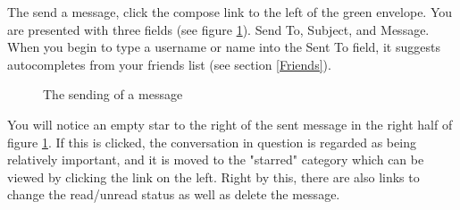 \documentclass[10pt]{article}
\begin{document}
\begin{flushleft}
The send a message, click the compose link to the left of the green envelope.  You are presented with three fields (see figure \ref{sos}).  Send To, Subject, and Message.  When you begin to type a username or name into the Sent To field, it suggests autocompletes from your friends list (see section \ref{Friends}).
\end{flushleft}

\begin{figure}[H]
    \centering
    \qquad
    \caption{The sending of a message}
    \label{sos}
\end{figure}

\begin{flushleft}
You will notice an empty star to the right of the sent message in the right half of figure \ref{sos}.  If this is clicked, the conversation in question is regarded as being relatively important, and it is moved to the "starred" category which can be viewed by clicking the link on the left.  Right by this, there are also links to change the read/unread status as well as delete the message. 
\end{flushleft}
\end{document}
